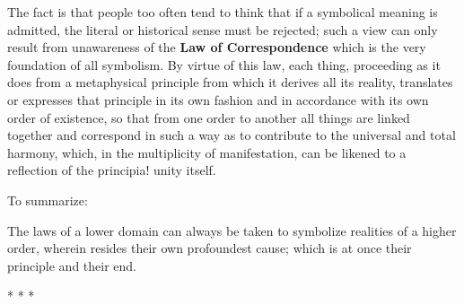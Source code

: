 \begin{quotex}
The fact is that people too often tend to think that if a symbolical meaning is admitted, the literal or historical sense must be rejected; such a view can only result from unawareness of the \textbf{Law of Correspondence} which is the very foundation of all symbolism. By virtue of this law, each thing, proceeding as it does from a metaphysical principle from which it derives all its reality, translates or expresses that principle in its own fashion and in accordance with its own order of existence, so that from one order to another all things are linked together and correspond in such a way as to contribute to the universal and total harmony, which, in the multiplicity of manifestation, can be likened to a reflection of the principia! unity itself. 

\end{quotex}
To summarize:

\begin{quotex}
The laws of a lower domain can always be taken to symbolize realities of a higher order, wherein resides their own profoundest cause; which is at once their principle and their end. 

\end{quotex}

\hfill


\begin{center}* * *\end{center}


